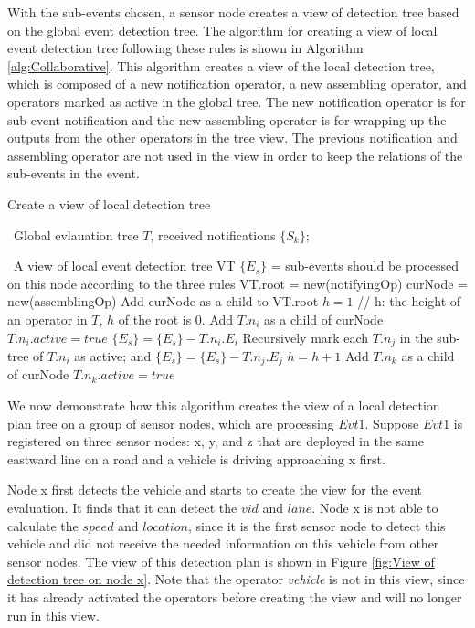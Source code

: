 \documentclass[12pt,journal,draftcls,letterpaper,onecolumn]{elsarticle}
\newcommand{\algorithmicinput}{\textbf{Input}}
\newcommand{\algorithmicoutput}{\textbf{Output}}
\newcommand{\INPUT}{\item[{\algorithmicinput}]$\phantom{1}$}
\newcommand{\OUTPUT}{\item[\algorithmicoutput]$\phantom{1}$}
\begin{document}
With the sub-events chosen, a sensor node creates a view of
detection tree based on the global event detection tree. The
algorithm for creating a view of local event detection tree
following these rules is shown in Algorithm \ref{alg:Collaborative}.
This algorithm creates a view of the local detection tree, which is
composed of a new notification operator, a new assembling operator,
and operators marked as active in the global tree. The new
notification operator is for sub-event notification and the new
assembling operator is for wrapping up the outputs from the other
operators in the tree view. The previous notification and assembling
operator are not used in the view in order to keep the relations of
the sub-events in the event.

\begin{algorithm} [ht]
\caption{Create a view of local detection tree}
\label{alg:Collaborative}
\begin{algorithmic}
\INPUT Global evlauation tree $T$, received notifications $\{S_k\}$;
\OUTPUT A view of local event detection tree VT
    \STATE $\{E_s\}$ = sub-events should be processed on this node according to the three rules
    \STATE VT.root = new(notifyingOp)
    \STATE curNode = new(assemblingOp)
    \STATE Add curNode as a child to VT.root
    \STATE $h = 1$ // h: the height of an operator in $T$, $h$ of the root is 0.
            \STATE Add $T.n_i$ as a child of curNode
            \STATE $T.n_i.active = true$
            \STATE $\{E_s\} = \{E_s\} - T.n_i.E_i$
            \STATE Recursively mark each $T.n_j$ in the sub-tree of $T.n_i$ as active; and $\{E_s\} = \{E_s\} -
            T.n_j.E_j$
       \ENDFOR
       \STATE $h = h + 1$
    \ENDWHILE
        \STATE Add $T.n_k$ as a child of curNode
        \STATE $T.n_k.active = true$
    \ENDFOR
\end{algorithmic}
\end{algorithm}

We now demonstrate how this algorithm creates the view of a local
detection plan tree on a group of sensor nodes, which are processing
$Evt1$. Suppose $Evt1$ is registered on three sensor nodes: x, y,
and z that are deployed in the same eastward line on a road and a
vehicle is driving approaching x first.

Node x first detects the vehicle and starts to create the view for
the event evaluation. It finds that it can detect the $vid$ and
$lane$. Node x is not able to calculate the $speed$ and $location$,
since it is the first sensor node to detect this vehicle and did not
receive the needed information on this vehicle from other sensor
nodes. The view of this detection plan is shown in Figure
\ref{fig:View of detection tree on node x}. Note that the operator
\emph{vehicle} is not in this view, since it has already activated
the operators before creating the view and will no longer run in
this view.
\end{document}
